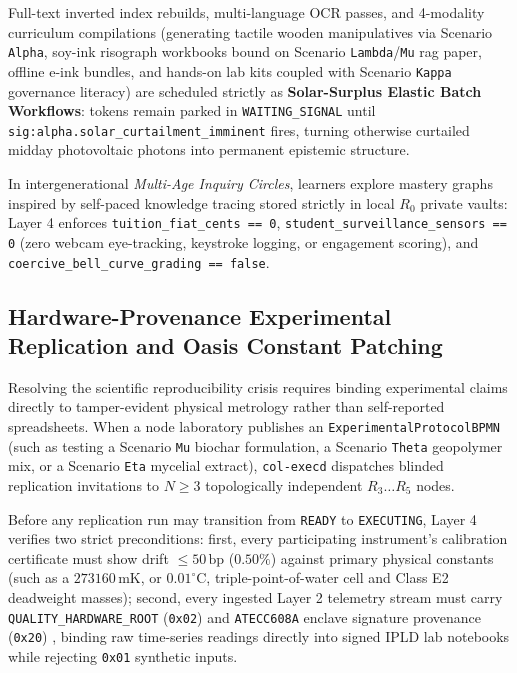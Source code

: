Full-text inverted index rebuilds, multi-language OCR passes, and 4-modality curriculum compilations
(generating tactile wooden manipulatives via Scenario \texttt{Alpha}, soy-ink risograph workbooks bound on
Scenario \texttt{Lambda}/\texttt{Mu} rag paper, offline e-ink bundles, and hands-on lab kits coupled with
Scenario \texttt{Kappa} governance literacy) are scheduled strictly as \textbf{Solar-Surplus Elastic Batch
Workflows}: tokens remain parked in \texttt{WAITING\_SIGNAL} until \texttt{sig:alpha.solar\_curtailment\_imminent}
fires, turning otherwise curtailed midday photovoltaic photons into permanent epistemic structure.

In intergenerational \emph{Multi-Age Inquiry Circles}, learners explore mastery graphs inspired by
self-paced knowledge tracing \parencite{corbett1995bkt} stored strictly in local $R_0$ private vaults:
Layer 4 enforces \texttt{tuition\_fiat\_cents == 0}, \texttt{student\_surveillance\_sensors == 0} (zero
webcam eye-tracking, keystroke logging, or engagement scoring), and
\texttt{coercive\_bell\_curve\_grading == false}.

\subsection{Hardware-Provenance Experimental Replication and Oasis Constant Patching}

Resolving the scientific reproducibility crisis requires binding experimental claims directly to tamper-evident
physical metrology rather than self-reported spreadsheets. When a node laboratory publishes an
\texttt{ExperimentalProtocolBPMN} (such as testing a Scenario \texttt{Mu} biochar formulation, a Scenario
\texttt{Theta} geopolymer mix, or a Scenario \texttt{Eta} mycelial extract), \texttt{col-execd} dispatches
blinded replication invitations to $N \ge 3$ topologically independent $R_3 \dots R_5$ nodes.

Before any replication run may transition from \texttt{READY} to \texttt{EXECUTING}, Layer 4 verifies two
strict preconditions: first, every participating instrument's calibration certificate must show drift
$\le 50\,\mathrm{bp}$ ($0.50\%$) against primary physical constants (such as a $273160\,\mathrm{mK}$, or
$0.01^\circ\mathrm{C}$, triple-point-of-water cell and Class E2 deadweight masses); second, every ingested
Layer 2 telemetry stream must carry \texttt{QUALITY\_HARDWARE\_ROOT} (\texttt{0x02}) and
\texttt{ATECC608A} enclave signature provenance (\texttt{0x20}) \parencite{microchip_atecc608a}, binding raw
time-series readings directly into signed IPLD lab notebooks while rejecting \texttt{0x01} synthetic inputs.

